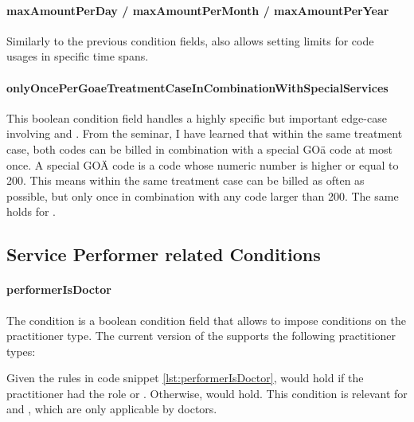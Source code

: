 \paragraph{maxAmountPerDay / maxAmountPerMonth / maxAmountPerYear}
Similarly to the previous condition fields, \RL also allows setting limits for code usages in specific time spans.


\paragraph{onlyOncePerGoaeTreatmentCaseInCombinationWithSpecialServices}
This boolean condition field handles a highly specific but important edge-case involving  and .
From the \PVC seminar, I have learned that within the same treatment case, both codes can be billed in combination with a special GOä code at most once.
A special GOÄ code is a code whose numeric number is higher or equal to 200.
This means within the same treatment case  can be billed as often as possible, but only once in combination with any code larger than 200.
The same holds for .

\subsection{Service Performer related Conditions}

\paragraph{performerIsDoctor}
The  condition is a boolean condition field that allows to impose conditions on the practitioner type.
The current version of the \AVS supports the following practitioner types:



Given the rules in code snippet \ref{lst:performerIsDoctor},  would hold if the practitioner had the role 
or .
Otherwise,  would hold.
This condition is relevant for  and , which are only applicable by doctors.




